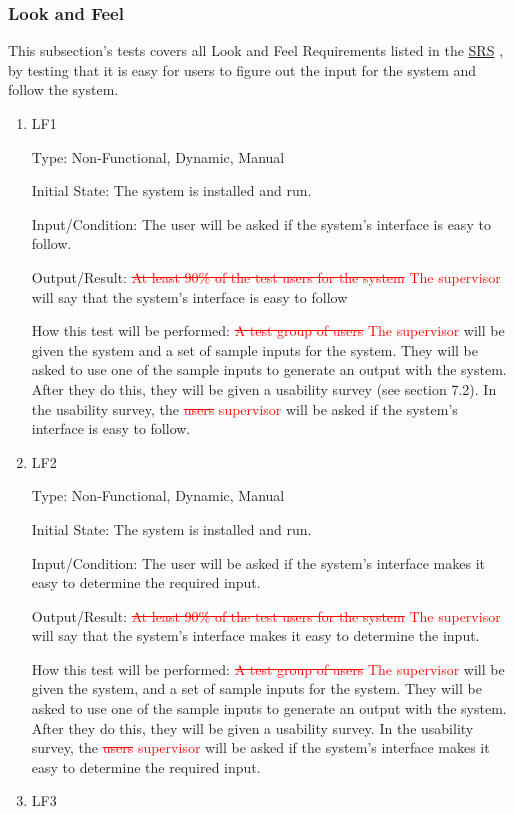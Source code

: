 \documentclass[12pt, titlepage]{article}
\begin{document}
\subsubsection{Look and Feel}
This subsection's tests covers all Look and Feel Requirements listed in the \href{https://github.com/paezha/PyERT-BLACK/blob/main/docs/SRS/SRS.pdf}{SRS} \citep{SRS}, by testing that it is easy for users to figure out the input for the system and follow the system. 

\begin{enumerate}

\item{LF1\\}\label{LF1}

Type: Non-Functional, Dynamic, Manual
					
Initial State: 
The system is installed and run.		

Input/Condition: 
The user will be asked if the system's interface is easy to follow.	

Output/Result: 
\textcolor{red}{\sout{At least 90\% of the test users for the system} The supervisor} will say that the system's interface is easy to follow
					
How this test will be performed:
\textcolor{red}{\sout{A test group of users} The supervisor } will be given the system and a set of sample inputs for the system. They will be asked to use one of the sample inputs to generate an output with the system. After they do this, they will be given a usability survey (see section 7.2). In the usability survey, the \textcolor{red}{\sout{users} supervisor}  will be asked if the system's interface is easy to follow.
\\
\item{LF2\\}\label{LF2}

Type: Non-Functional, Dynamic, Manual
					
Initial State: 
The system is installed and run.

Input/Condition: 
The user will be asked if the system's interface makes it easy to determine the required input.			

Output/Result: 
\textcolor{red}{\sout{At least 90\% of the test users for the system} The supervisor} will say that the system's interface makes it easy to determine the input.
					
How this test will be performed:
\textcolor{red}{\sout{A test group of users } The supervisor} will be given the system, and a set of sample inputs for the system. They will be asked to use one of the sample inputs to generate an output with the system. After they do this, they will be given a usability survey. In the usability survey, the \textcolor{red}{\sout{users} supervisor} will be asked if the system's interface makes it easy to determine the required input.	
\\
\item{LF3\\}\label{LF3}


\end{enumerate}
\end{document}

